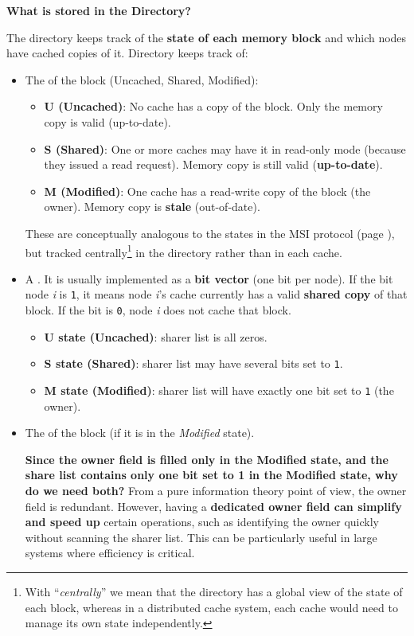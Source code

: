 \begin{flushleft}
    \textcolor{Green3}{ \textbf{What is stored in the Directory?}}    
\end{flushleft}
The directory keeps track of the \textbf{state of each memory block} and which nodes have cached copies of it. Directory keeps track of:
\begin{itemize}
    \item The  of the block (Uncached, Shared, Modified):
    \begin{itemize}
        \item \textbf{U (Uncached)}: No cache has a copy of the block. Only the memory copy is valid (up-to-date).
        \item \textbf{S (Shared)}: One or more caches may have it in read-only mode (because they issued a read request). Memory copy is still valid (\textbf{up-to-date}).
        \item \textbf{M (Modified)}: One cache has a read-write copy of the block (the owner). Memory copy is \textbf{stale} (out-of-date).
    \end{itemize}
    These are conceptually analogous to the states in the MSI protocol (page \pageref{fig: msi-finite-state-machine}), but tracked centrally\footnote{%
        With ``\emph{centrally}'' we mean that the directory has a global view of the state of each block, whereas in a distributed cache system, each cache would need to manage its own state independently.
    } in the directory rather than in each cache.

    \item A . It is usually implemented as a \textbf{bit vector} (one bit per node). If the bit node \emph{i} is \texttt{1}, it means node \emph{i}'s cache currently has a valid \textbf{shared copy} of that block. If the bit is \texttt{0}, node \emph{i} does not cache that block.
    \begin{itemize}
        \item \textbf{U state (Uncached)}: sharer list is all zeros.
        \item \textbf{S state (Shared)}: sharer list may have several bits set to \texttt{1}.
        \item \textbf{M state (Modified)}: sharer list will have exactly one bit set to \texttt{1} (the owner).
    \end{itemize}

    \item The  of the block (if it is in the \emph{Modified} state).

    \textcolor{Green3}{ \textbf{Since the owner field is filled only in the Modified state, and the share list contains only one bit set to 1 in the Modified state, why do we need both?}} From a pure information theory point of view, the owner field is redundant. However, having a \textbf{dedicated owner field can simplify and speed up} certain operations, such as identifying the owner quickly without scanning the sharer list. This can be particularly useful in large systems where efficiency is critical.
\end{itemize}
